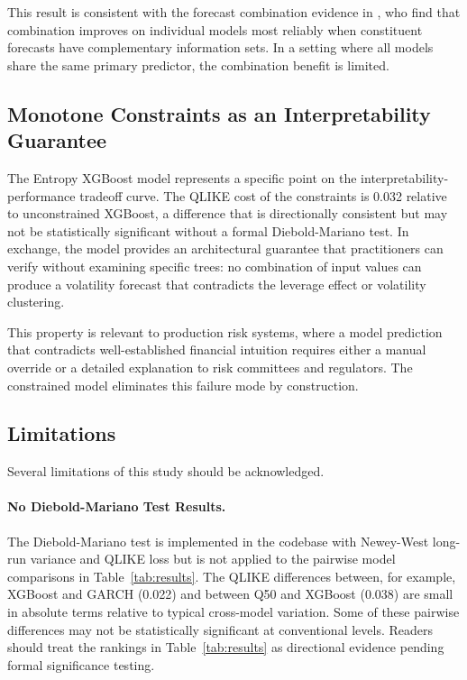 \documentclass[12pt]{article}
\begin{document}
This result is consistent with the forecast combination evidence in
\citet{RapachZhou2013}, who find that combination improves on individual
models most reliably when constituent forecasts have complementary information
sets.  In a setting where all models share the same primary predictor, the
combination benefit is limited.

\subsection{Monotone Constraints as an Interpretability Guarantee}

The Entropy XGBoost model represents a specific point on the
interpretability-performance tradeoff curve.  The QLIKE cost of the
constraints is 0.032 relative to unconstrained XGBoost, a difference that is
directionally consistent but may not be statistically significant without a
formal Diebold-Mariano test.  In exchange, the model provides an
architectural guarantee that practitioners can verify without examining
specific trees: no combination of input values can produce a volatility
forecast that contradicts the leverage effect or volatility clustering.

This property is relevant to production risk systems, where a model prediction
that contradicts well-established financial intuition requires either a manual
override or a detailed explanation to risk committees and regulators.  The
constrained model eliminates this failure mode by construction.

\subsection{Limitations}

Several limitations of this study should be acknowledged.

\paragraph{No Diebold-Mariano Test Results.}
The Diebold-Mariano test \citep{DieboldMariano1995} is implemented in the
codebase with Newey-West long-run variance and QLIKE loss but is not applied
to the pairwise model comparisons in Table~\ref{tab:results}.  The QLIKE
differences between, for example, XGBoost and GARCH (0.022) and between Q50
and XGBoost (0.038) are small in absolute terms relative to typical
cross-model variation.  Some of these pairwise differences may not be
statistically significant at conventional levels.  Readers should treat the
rankings in Table~\ref{tab:results} as directional evidence pending formal
significance testing.
\end{document}
